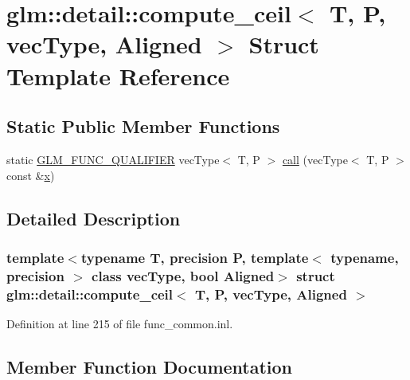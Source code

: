 \hypertarget{structglm_1_1detail_1_1compute__ceil}{}\section{glm\+::detail\+::compute\+\_\+ceil$<$ T, P, vec\+Type, Aligned $>$ Struct Template Reference}
\label{structglm_1_1detail_1_1compute__ceil}
\subsection*{Static Public Member Functions}
\begin{DoxyCompactItemize}
\item 
static \mbox{\hyperlink{setup_8hpp_a33fdea6f91c5f834105f7415e2a64407}{G\+L\+M\+\_\+\+F\+U\+N\+C\+\_\+\+Q\+U\+A\+L\+I\+F\+I\+ER}} vec\+Type$<$ T, P $>$ \mbox{\hyperlink{structglm_1_1detail_1_1compute__ceil_a0372c5733d1160f0200871177eab6e07}{call}} (vec\+Type$<$ T, P $>$ const \&\mbox{\hyperlink{glad_8h_a92d0386e5c19fb81ea88c9f99644ab1d}{x}})
\end{DoxyCompactItemize}


\subsection{Detailed Description}
\subsubsection*{template$<$typename T, precision P, template$<$ typename, precision $>$ class vec\+Type, bool Aligned$>$\newline
struct glm\+::detail\+::compute\+\_\+ceil$<$ T, P, vec\+Type, Aligned $>$}



Definition at line 215 of file func\+\_\+common.\+inl.



\subsection{Member Function Documentation}
\mbox{\label{structglm_1_1detail_1_1compute__ceil_a0372c5733d1160f0200871177eab6e07}} 
